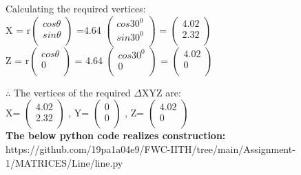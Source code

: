 \documentclass[10pt,a4paper]{report}
\begin{document}
\begin{multicols}{2}
\raggedright Calculating the required vertices: \\ \vspace{2mm}
\centering X = r$\begin{pmatrix} 
  cos \theta\\
  sin \theta\\
 \end{pmatrix}$ =4.64 $\begin{pmatrix} 
  cos30^0\\
  sin30^0\\
 \end{pmatrix}$ = $\begin{pmatrix}
                 4.02\\
                 2.32\\
              \end{pmatrix}$ \\ \vspace{2mm}
\centering Z = r$\begin{pmatrix} 
  cos \theta\\
  0\\
 \end{pmatrix}$ = 4.64 $\begin{pmatrix} 
  cos30^0\\
  0\\
 \end{pmatrix}$ = $\begin{pmatrix}
                  4.02\\
                  0\\
              \end{pmatrix}$\\ \vspace{2mm}
\raggedright $\therefore$ The vertices of the required $\Delta$XYZ are:\\ \vspace{2mm}
\centering X= $\begin{pmatrix}
                 4.02\\
                 2.32\\
              \end{pmatrix}$%
              , Y= $\begin{pmatrix}
                 0\\
                 0\\
              \end{pmatrix}$%
               , Z= $\begin{pmatrix}
                  4.02\\
                  0\\
              \end{pmatrix}$%
 \vspace{3mm}             
\\
\textbf{The below python code realizes construction:}\\
https://github.com/19pa1a04e9/FWC-IITH/tree/main/Assignment-1/MATRICES/Line/line.py
  

\end{multicols}
\end{document}
